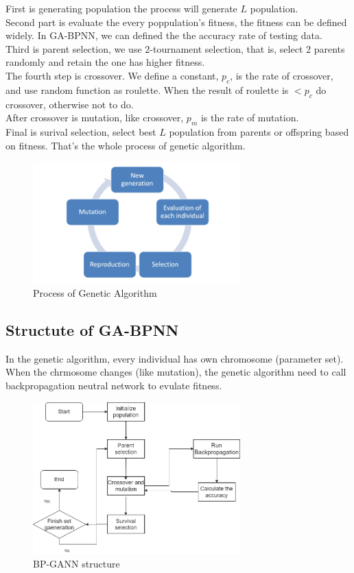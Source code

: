 \documentclass[conference]{IEEEtran}
\begin{document}
First is generating population the process will generate $L$ population.\\

Second part is evaluate the every poppulation's fitness, the fitness can be defined widely. In GA-BPNN, we can defined the the accuracy rate of testing data.\\

Third is parent selection, we use 2-tournament selection, that is, select 2 parents randomly and retain the one has higher fitness.\\

The fourth step is crossover. We define a constant, $p_c$, is the rate of crossover, and use random function as roulette. When the result of roulette is $< p_c$ do crossover, otherwise not to do.\\

After crossover is mutation, like crossover, $p_m$ is the 
rate of mutation.\\

Final is surival selection, select best $L$ population from parents or offspring based on fitness. That's the whole process of genetic algorithm.\cite{b1}\\

\begin{figure}[htbp]
\centerline{\includegraphics[width=8cm]{Genetic_algorithm.png}}
\caption{Process of Genetic Algorithm}
\label{fig}
\end{figure}


\subsection{Structute of GA-BPNN}
In the genetic algorithm, every individual has own chromosome (parameter set). When the chrmosome changes (like mutation), the genetic algorithm need to call backpropagation neutral network to evulate fitness.

\begin{figure}[htbp]
\centerline{\includegraphics[width=8cm]{BP_GANN_structure.png}}
\caption{BP-GANN structure}
\label{fig}
\end{figure}
\end{document}
